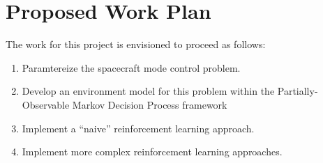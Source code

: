 \documentclass[]{article}
\begin{document}
\section{Proposed Work Plan}

The work for this project is envisioned to proceed as follows:
\begin{enumerate}
	\item Paramtereize the spacecraft mode control problem.
	\item Develop an environment model for this problem within the Partially-Observable Markov Decision Process framework
	\item Implement a ``naive'' reinforcement learning approach.
	\item Implement more complex reinforcement learning approaches.
\end{enumerate}
	
\end{document}
